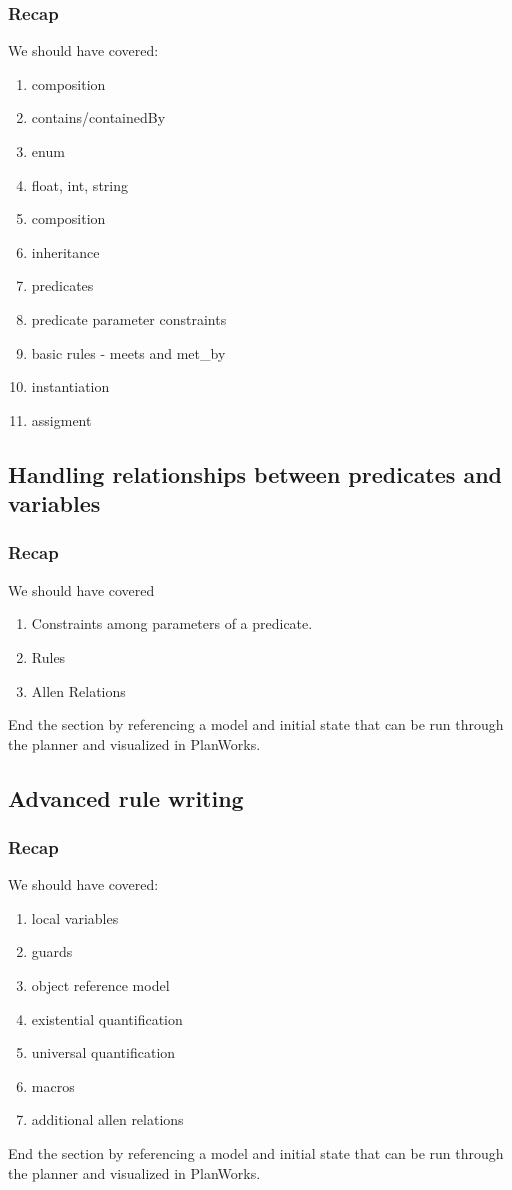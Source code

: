 \documentclass[10pt, letterpaper, twoside]{article}
\begin{document}
\subsubsection{Recap}
We should have covered:
\begin{enumerate}
\item composition
\item contains/containedBy
\item enum
\item float, int, string
\item composition
\item inheritance
\item predicates
\item predicate parameter constraints
\item basic rules - meets and met\_by
\item instantiation
\item assigment
\end{enumerate}

\subsection{Handling relationships between predicates and variables}
\subsubsection{Recap}
We should have covered
\begin{enumerate}
\item Constraints among parameters of a predicate.
\item Rules
\item Allen Relations
\end{enumerate}
End the section by referencing a model and initial state that can be run through the planner and visualized in PlanWorks.

\subsection{Advanced rule writing}
\subsubsection{Recap}
We should have covered:
\begin{enumerate}
\item local variables
\item guards
\item object reference model
\item existential quantification
\item universal quantification
\item macros
\item additional allen relations
\end{enumerate}
End the section by referencing a model and initial state that can be run through the planner and visualized in PlanWorks.
\end{document}
